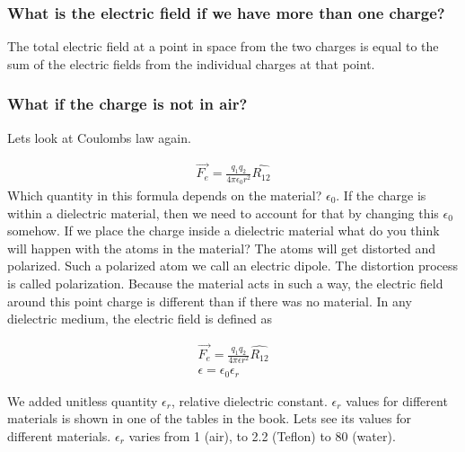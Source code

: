 \documentclass{ximera}
\begin{document}

\subsubsection{What is the electric field if we have more than one charge?}

The total electric field at a point in space from the two charges is equal to the sum of the electric fields from the individual charges at that point.


\subsubsection{What if the charge is not in air?} 

Lets look at Coulombs law again. 


\begin{eqnarray}
\vec{F_e}=\frac{q_1 q_2}{4 \pi \epsilon_0 r^2} \hat{R_{12}}
\end{eqnarray}\label{Coulombslaw2}
Which quantity in this formula depends on the material? $\epsilon_0$. If the charge is within a dielectric material, then we need to account for that by changing this $\epsilon_0$ somehow. If we place the charge inside a dielectric material what do you think will happen with the atoms in the material? The atoms will get distorted and polarized. Such a polarized atom we call an electric dipole. The distortion process is called polarization. Because the material acts in such a way, the electric field around this point charge is different than if there was no material. In any dielectric medium, the electric field is defined as


\begin{eqnarray}
\vec{F_e}=\frac{q_1 q_2}{4 \pi \epsilon r^2} \hat{R_{12}} \\
\epsilon = \epsilon_0 \epsilon_r
\end{eqnarray}\label{Coulombslaw3}

We added unitless quantity $\epsilon_r$, relative dielectric constant. $\epsilon_r$ values for different materials is shown in one of the tables in the book. Lets see its values for different materials. $\epsilon_r$ varies from 1 (air), to 2.2 (Teflon) to 80 (water). 
\end{document}
